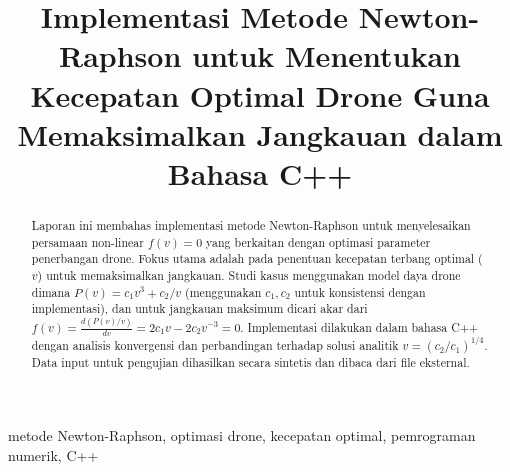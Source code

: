 \documentclass[conference]{IEEEtran}
\begin{document}
\title{Implementasi Metode Newton-Raphson untuk Menentukan Kecepatan Optimal Drone Guna Memaksimalkan Jangkauan dalam Bahasa C++}

\author{
\and
\and
\and
\and
}

\maketitle

\begin{abstract}
Laporan ini membahas implementasi metode Newton-Raphson untuk menyelesaikan persamaan non-linear $f(v)=0$ yang berkaitan dengan optimasi parameter penerbangan drone. Fokus utama adalah pada penentuan kecepatan terbang optimal ($v$) untuk memaksimalkan jangkauan. Studi kasus menggunakan model daya drone dimana $P(v) = c_1v^3 + c_2/v$ (menggunakan $c_1, c_2$ untuk konsistensi dengan implementasi), dan untuk jangkauan maksimum dicari akar dari $f(v) = \frac{d(P(v)/v)}{dv} = 2c_1v - 2c_2v^{-3} = 0$. Implementasi dilakukan dalam bahasa C++ dengan analisis konvergensi dan perbandingan terhadap solusi analitik $v = (c_2/c_1)^{1/4}$. Data input untuk pengujian dihasilkan secara sintetis dan dibaca dari file eksternal.
\end{abstract}

\begin{IEEEkeywords}
metode Newton-Raphson, optimasi drone, kecepatan optimal, pemrograman numerik, C++
\end{IEEEkeywords}
\end{document}
